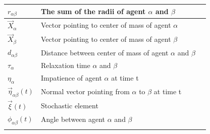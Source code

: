 \begin{center}
\begin{tabular}{lll}
\hline
$r_{\alpha \beta}$ & The sum of the radii of agent $\alpha$ and $\beta$ & \\
\hline
$\vec{X}_{\alpha}$ & Vector pointing to center of mass of agent $\alpha$ & \\
\hline
$\vec{X}_{\beta}$ & Vector pointing to center of mass of agent $\beta$ & \\
\hline
$d_{\alpha \beta}$ & Distance between center of mass of agent $\alpha$ and $\beta$ & \\
\hline
$\tau_{\alpha}$ & Relaxation time $\alpha$ and $\beta$ & \\
\hline
$\eta_{\alpha}$ & Impatience of agent $\alpha$ at time t & \\
\hline
$\vec{\eta}_{\alpha \beta}\left( t \right)$ & Normal vector pointing from $\alpha$ to $\beta$ at time t & \\
\hline
$\vec{\xi}\left( t \right)$ & Stochastic element & \\
\hline
$\phi_{\alpha \beta} \left( t \right)$ & Angle between agent $\alpha$ and $\beta$ & \\
\hline
\label{tableofconstandvar}
\end{tabular}
\end{center}

\clearpage

